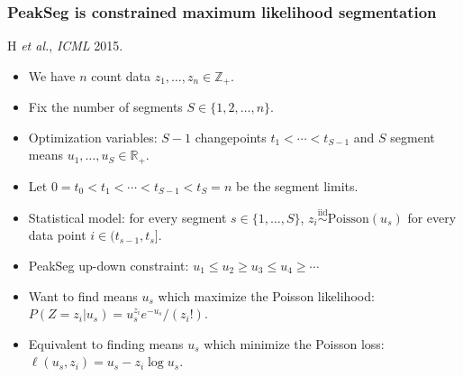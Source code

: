 \documentclass{beamer}
\newcommand{\RR}{\mathbb R}
\newcommand{\ZZ}{\mathbb Z}
\begin{document}
\begin{frame}
  \frametitle{PeakSeg is constrained maximum likelihood segmentation}
  H {\it et al.}, {\it ICML} 2015. 

  
  \vskip -0.8cm    
  \begin{itemize}
  \item We have $n$ count data $z_1, \dots, z_n\in\ZZ_+$.
  \item Fix the number of segments $S\in\{1, 2, \dots, n\}$.
  \item Optimization variables: $S-1$ changepoints
    $t_1 < \cdots < t_{S-1}$ and $S$ segment means $u_1,\dots,u_S\in\RR_+$.
  \item Let $0=t_0<t_1 < \cdots < t_{S-1}<t_S=n$ be the segment
    limits.
  \item Statistical model: for every segment $s\in\{1,\dots,S\}$,
    $z_i \stackrel{\text{iid}}{\sim} \text{Poisson}(u_s)$ for every data
    point $i\in(t_{s-1},t_s]$.
  \item PeakSeg up-down constraint: $u_1\leq u_2 \geq u_3 \leq u_4 \geq \cdots$
  \item Want to find means $u_s$ which maximize the Poisson likelihood:
    $P(Z = z_i|u_s) = u_s^{z_i} e^{-u_s} / (z_i!)$.
  \item Equivalent to finding means $u_s$ which minimize the Poisson
    loss: $\ell(u_s, z_i) = u_s - z_i\log u_s$.
  \end{itemize}
\end{frame}
\end{document}
